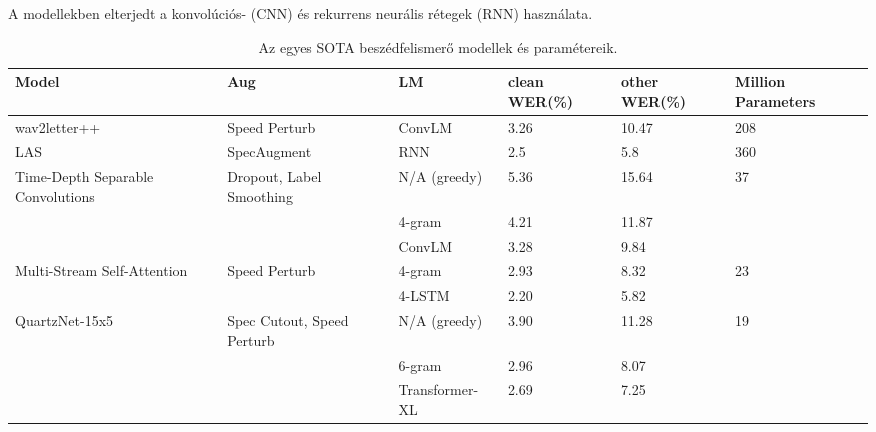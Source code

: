 A modellekben elterjedt a konvolúciós- (CNN) és rekurrens neurális rétegek  (RNN) használata.

\begin{table}[ht]
	\footnotesize
	\centering
	\begin{tabular}{ p{2cm} p{2.5cm} p{2.5cm} p{1.5cm} p{1.5cm} p{1.5cm} }
		\toprule
		\textbf{Model} & \textbf{Aug} & \textbf{LM} & \textbf{clean WER(\%)} & \textbf{other WER(\%)} & \textbf{Million Parameters} \\
		\midrule
		wav2letter++\cite{w2l} & Speed Perturb & ConvLM & 3.26 & 10.47 & 208 \\
		\hline
		LAS\cite{las} & SpecAugment & RNN & 2.5 & 5.8 & 360 \\
		\hline
		Time-Depth Separable Convolutions\cite{timedepth} & Dropout, Label Smoothing & N/A (greedy) & 5.36 & 15.64 & 37 \\
		&  & 4-gram & 4.21 & 11.87 &  \\
		&  & ConvLM & 3.28 & 9.84 &  \\
		\hline
		Multi-Stream Self-Attention\cite{attention} & Speed Perturb & 4-gram & 2.93 & 8.32 & 23  \\
		&  & 4-LSTM & 2.20 & 5.82 &  \\
		\hline
		QuartzNet-15x5\cite{quartznet} & Spec Cutout, Speed Perturb & N/A (greedy) & 3.90 & 11.28 & 19 \\
		&  & 6-gram & 2.96 & 8.07 &  \\
		&  & Transformer-XL & 2.69 & 7.25 &  \\
		\bottomrule
	\end{tabular}
	\caption{Az egyes SOTA beszédfelismerő modellek és paramétereik.}
\end{table}
